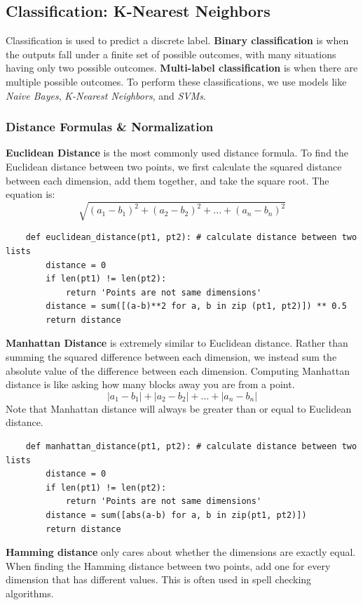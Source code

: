 \documentclass[11pt, a4paper]{article}
\begin{document}
\begin{spacing}{1.1}
	\subsection{Classification: K-Nearest Neighbors}
	Classification is used to predict a discrete label. \textbf{Binary classification} is when the outputs fall under a finite set of possible outcomes, with many situations having only two possible outcomes. \textbf{Multi-label classification} is when there are multiple possible outcomes. To perform these classifications, we use models like \textit{Naive Bayes}, \textit{K-Nearest Neighbors}, and \textit{SVMs}.
	\subsubsection{Distance Formulas \& Normalization}
	\textbf{Euclidean Distance} is the most commonly used distance formula. To find the Euclidean distance between two points, we first calculate the squared distance between each dimension, add them together, and take the square root. The equation is: $$ \sqrt{(a_1-b_1)^2 + (a_2-b_2)^2 + ... + (a_n-b_n)^2} $$
	\begin{lstlisting}
	def euclidean_distance(pt1, pt2): # calculate distance between two lists
		distance = 0
		if len(pt1) != len(pt2):
			return 'Points are not same dimensions'
		distance = sum([(a-b)**2 for a, b in zip (pt1, pt2)]) ** 0.5
		return distance	\end{lstlisting}\vspace*{2mm}
	\textbf{Manhattan Distance} is extremely similar to Euclidean distance. Rather than summing the squared difference between each dimension, we instead sum the absolute value of the difference between each dimension. Computing Manhattan distance is like asking how many blocks away you are from a point. $$ |a_1-b_1| + |a_2-b_2| + ... + |a_n-b_n| $$ Note that Manhattan distance will always be greater than or equal to Euclidean distance.
	\begin{lstlisting}
	def manhattan_distance(pt1, pt2): # calculate distance between two lists
		distance = 0
		if len(pt1) != len(pt2):
			return 'Points are not same dimensions'
		distance = sum([abs(a-b) for a, b in zip(pt1, pt2)])
		return distance\end{lstlisting}\vspace*{2mm}
	\textbf{Hamming distance} only cares about whether the dimensions are exactly equal. When finding the Hamming distance between two points, add one for every dimension that has different values. This is often used in spell checking algorithms. 

\end{spacing}
\end{document}
